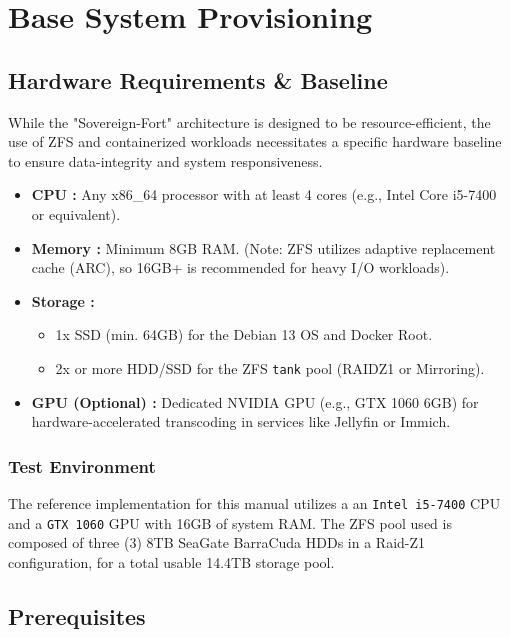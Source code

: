 \chapter{Base System Provisioning}\label{chap:base-provisioning}
\section{Hardware Requirements \& Baseline}
While the "Sovereign-Fort" architecture is designed to be resource-efficient, the use of ZFS and containerized workloads necessitates a specific hardware baseline to ensure data-integrity and system responsiveness.

\begin{itemize}
	\item \textbf{CPU :} Any x86\_64 processor with at least 4 cores (e.g., Intel Core i5-7400 or equivalent).
	\item \textbf{Memory :} Minimum 8GB RAM. (Note: ZFS utilizes adaptive replacement cache (ARC), so 16GB+ is recommended for heavy I/O workloads).
	\item \textbf{Storage :} 
	\begin{itemize}
		\item 1x SSD (min. 64GB) for the Debian 13 OS and Docker Root.
		\item 2x or more HDD/SSD for the ZFS \texttt{tank} pool (RAIDZ1 or Mirroring).
	\end{itemize}
	\item \textbf{GPU (Optional) :} Dedicated NVIDIA GPU (e.g., GTX 1060 6GB) for hardware-accelerated transcoding in services like Jellyfin or Immich.
\end{itemize}

\subsection{Test Environment}
The reference implementation for this manual utilizes a an \texttt{Intel i5-7400} CPU and a \texttt{GTX 1060} GPU with 16\unit{GB} of system RAM. The ZFS pool used is composed of three (3) 8\unit{TB} SeaGate BarraCuda HDDs in a Raid-Z1 configuration, for a total usable 14.4\unit{TB} storage pool.

\section{Prerequisites}


